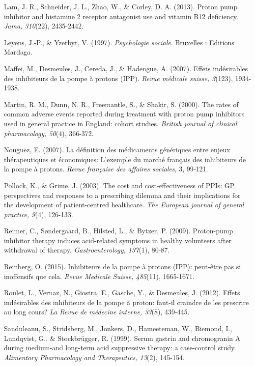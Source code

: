 \begin{thebibliography}{9}
 Lam, J. R., Schneider, J. L., Zhao, W., \& Corley, D. A. (2013). Proton pump inhibitor and histamine 2 receptor antagonist use and vitamin B12 deficiency. \textit{Jama, 310}(22), 2435-2442. 
  
  Leyens, J.-P., \& Yzerbyt, V. (1997). \textit{Psychologie sociale}. Bruxelles : Editions Mardaga.
  
 Maffei, M., Desmeules, J., Cereda, J., \& Hadengue, A. (2007). Effets indésirables des inhibiteurs de la pompe à protons (IPP). \textit{Revue médicale suisse, 3}(123), 1934-1938. 
  
 Martin, R. M., Dunn, N. R., Freemantle, S., \& Shakir, S. (2000). The rates of common adverse events reported during treatment with proton pump inhibitors used in general practice in England: cohort studies. \textit{British journal of clinical pharmacology, 50}(4), 366-372. 
  
  Nouguez, E. (2007). La définition des médicaments génériques entre enjeux thérapeutiques et économiques: L'exemple du marché français des inhibiteurs de la pompe à protons. \textit{Revue française des affaires sociales}, 3, 99-121. 
  
  Pollock, K., \& Grime, J. (2003). The cost and cost-effectiveness of PPIs: GP perspectives and responses to a prescribing dilemma and their implications for the development of patient-centred healthcare. \textit{The European journal of general practice, 9}(4), 126-133. 
  
 Reimer, C., Søndergaard, B., Hilsted, L., \& Bytzer, P. (2009). Proton-pump inhibitor therapy induces acid-related symptoms in healthy volunteers after withdrawal of therapy. \textit{Gastroenterology, 137}(1), 80-87. 
  
  Reinberg, O. (2015). Inhibiteurs de la pompe à protons (IPP): peut-être pas si inoffensifs que cela. \textit{Revue Medicale Suisse, 485}(11), 1665-1671. 
  
  Roulet, L., Vernaz, N., Giostra, E., Gasche, Y., \& Desmeules, J. (2012). Effets indésirables des inhibiteurs de la pompe à proton: faut-il craindre de les prescrire au long cours? \textit{La Revue de médecine interne, 33}(8), 439-445. 
  
  Sanduleanu, S., Stridsberg, M., Jonkers, D., Hameeteman, W., Biemond, I., Lundqvist, G., \& Stockbrügger, R. (1999). Serum gastrin and chromogranin A during medium-and long-term acid suppressive therapy: a case-control study. \textit{Alimentary Pharmacology and Therapeutics, 13}(2), 145-154. 
  

\end{thebibliography}
